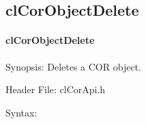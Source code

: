\begin{flushleft}
\subsection{clCorObjectDelete}
\hypertarget{pagecor102}{}\paragraph{cl\-Cor\-Object\-Delete}\label{pagecor102}
\begin{Desc}
\item[Synopsis:]Deletes a COR object.\end{Desc}
\begin{Desc}
\item[Header File:]clCorApi.h\end{Desc}
\begin{Desc}
\item[Syntax:]


\end{Desc}
\end{flushleft}
